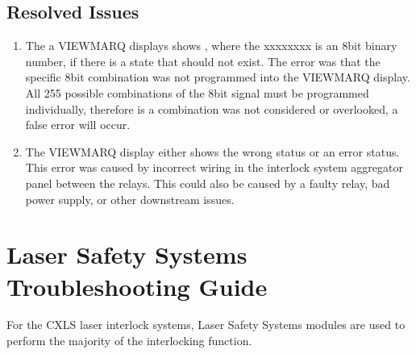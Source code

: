 \documentclass[letterpaper,10pt,english]{sphinxmanual}
\begin{document}
\subsection{Resolved Issues}
\label{\detokenize{troubleshooting_documentation/viewmarq:resolved-issues}}\begin{enumerate}
%
\item {} 
\sphinxAtStartPar
The a VIEWMARQ displays shows , where the xxxxxxxx is an 8\sphinxhyphen{}bit binary number, if there is a state that should not exist.
The error was that the specific 8\sphinxhyphen{}bit combination was not programmed into the VIEWMARQ display.
All 255 possible combinations of the 8\sphinxhyphen{}bit signal must be programmed individually, therefore is a combination was not considered or overlooked, a false error will occur.

\item {} 
\sphinxAtStartPar
The VIEWMARQ display either shows the wrong status or an error status.
This error was caused by incorrect wiring in the interlock system aggregator panel between the relays.
This could also be caused by a faulty relay, bad power supply, or other downstream issues.

\end{enumerate}

\sphinxstepscope


\section{Laser Safety Systems Troubleshooting Guide}
\label{\detokenize{troubleshooting_documentation/laser_safety_systems:laser-safety-systems-troubleshooting-guide}}\label{\detokenize{troubleshooting_documentation/laser_safety_systems::doc}}
\sphinxAtStartPar
For the CXLS laser interlock systems, Laser Safety Systems modules are used to perform the majority of the interlocking function.
\end{document}
